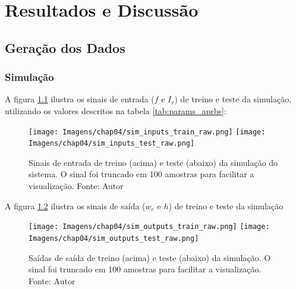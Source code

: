 \chapter{Resultados e Discussão}
\label{chap4}
\section{Geração dos Dados}
\subsection{Simulação}
A figura \ref{fig:sim_inputs_raw} ilustra os sinais de entrada ($f$ e $I_r$) de treino e teste da simulação, utilizando os valores descritos na tabela \ref{tab:params_aprbs}:

\begin{figure}[hbt!]
    \centering
    \texttt{[image: Imagens/chap04/sim\_inputs\_train\_raw.png]}
    \hfill
    \texttt{[image: Imagens/chap04/sim\_inputs\_test\_raw.png]}
    \caption{Sinais de entrada de treino (acima) e teste (abaixo) da simulação do sistema. O sinal foi truncado em 100 amostras para facilitar a visualização. Fonte: Autor}
    \label{fig:sim_inputs_raw}
\end{figure}

A figura \ref{fig:sim_outputs_raw} ilustra os sinais de saída ($w_e$ e $h$) de treino e teste da simulação

\begin{figure}[hbt!]
    \centering
    \texttt{[image: Imagens/chap04/sim\_outputs\_train\_raw.png]}
    \hfill
    \texttt{[image: Imagens/chap04/sim\_outputs\_test\_raw.png]}
    \caption{Saídas de saída de treino (acima) e teste (abaixo) da simulação. O sinal foi truncado em 100 amostras para facilitar a visualização. Fonte: Autor}
    \label{fig:sim_outputs_raw}
\end{figure}


